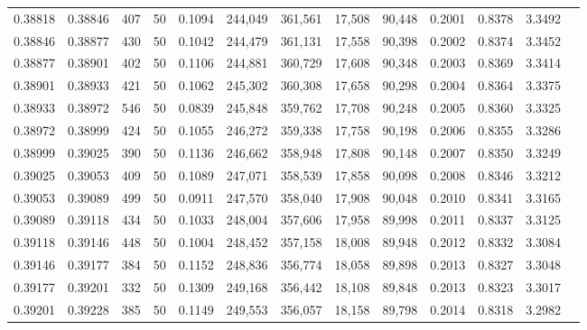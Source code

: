 \begin{tabular}{rrrrrrrrrrrrr}
0.38818 & 0.38846 &   407 &  50 &                                     0.1094 & 244,049 & 361,561 &  17,508 &  90,448 & 0.2001 & 0.8378 & 3.3492 \\
0.38846 & 0.38877 &   430 &  50 &                                     0.1042 & 244,479 & 361,131 &  17,558 &  90,398 & 0.2002 & 0.8374 & 3.3452 \\
0.38877 & 0.38901 &   402 &  50 &                                     0.1106 & 244,881 & 360,729 &  17,608 &  90,348 & 0.2003 & 0.8369 & 3.3414 \\
0.38901 & 0.38933 &   421 &  50 &                                     0.1062 & 245,302 & 360,308 &  17,658 &  90,298 & 0.2004 & 0.8364 & 3.3375 \\
0.38933 & 0.38972 &   546 &  50 &                                     0.0839 & 245,848 & 359,762 &  17,708 &  90,248 & 0.2005 & 0.8360 & 3.3325 \\
0.38972 & 0.38999 &   424 &  50 &                                     0.1055 & 246,272 & 359,338 &  17,758 &  90,198 & 0.2006 & 0.8355 & 3.3286 \\
0.38999 & 0.39025 &   390 &  50 &                                     0.1136 & 246,662 & 358,948 &  17,808 &  90,148 & 0.2007 & 0.8350 & 3.3249 \\
0.39025 & 0.39053 &   409 &  50 &                                     0.1089 & 247,071 & 358,539 &  17,858 &  90,098 & 0.2008 & 0.8346 & 3.3212 \\
0.39053 & 0.39089 &   499 &  50 &                                     0.0911 & 247,570 & 358,040 &  17,908 &  90,048 & 0.2010 & 0.8341 & 3.3165 \\
0.39089 & 0.39118 &   434 &  50 &                                     0.1033 & 248,004 & 357,606 &  17,958 &  89,998 & 0.2011 & 0.8337 & 3.3125 \\
0.39118 & 0.39146 &   448 &  50 &                                     0.1004 & 248,452 & 357,158 &  18,008 &  89,948 & 0.2012 & 0.8332 & 3.3084 \\
0.39146 & 0.39177 &   384 &  50 &                                     0.1152 & 248,836 & 356,774 &  18,058 &  89,898 & 0.2013 & 0.8327 & 3.3048 \\
0.39177 & 0.39201 &   332 &  50 &                                     0.1309 & 249,168 & 356,442 &  18,108 &  89,848 & 0.2013 & 0.8323 & 3.3017 \\
0.39201 & 0.39228 &   385 &  50 &                                     0.1149 & 249,553 & 356,057 &  18,158 &  89,798 & 0.2014 & 0.8318 & 3.2982 \\

\end{tabular}
